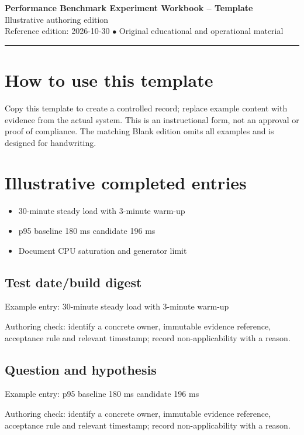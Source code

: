 \documentclass[10pt,letterpaper]{article}
\begin{document}
\begin{center}
{\LARGE\bfseries\color{cdblue}Performance Benchmark Experiment Workbook -- Template}\\[7pt]
{\large Illustrative authoring edition}\\[6pt]
{\small Reference edition: 2026-10-30 $\bullet$ Original educational and operational material}
\end{center}
\noindent\color{cdblue}\rule{\linewidth}{1.2pt}\color{black}
\vspace{0.4em}
\section{How to use this template}
Copy this template to create a controlled record; replace example content with evidence from the actual system. This is an instructional form, not an approval or proof of compliance. The matching Blank edition omits all examples and is designed for handwriting.


\section{Illustrative completed entries}
\begin{itemize}
\item 30-minute steady load with 3-minute warm-up
\item p95 baseline 180 ms candidate 196 ms
\item Document CPU saturation and generator limit
\end{itemize}

\subsection{Test date/build digest}
Example entry: 30-minute steady load with 3-minute warm-up

Authoring check: identify a concrete owner, immutable evidence reference, acceptance rule and relevant timestamp; record non-applicability with a reason.


\subsection{Question and hypothesis}
Example entry: p95 baseline 180 ms candidate 196 ms

Authoring check: identify a concrete owner, immutable evidence reference, acceptance rule and relevant timestamp; record non-applicability with a reason.
\end{document}
